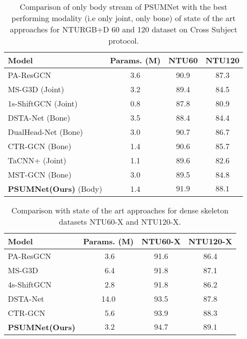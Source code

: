 \documentclass[runningheads]{llncs}
\begin{document}
\begin{table}[!t]
  \resizebox{0.75\linewidth}{!} 
    {\begin{tabular}{l|c|cc}
    \toprule
    Model & Params. (M) &  NTU60 & NTU120\\
    \midrule
PA-ResGCN\cite{song2020stronger} & 3.6 & 90.9 & 87.3 \\
    MS-G3D (Joint)\cite{liu2020disentangling} & 3.2 & 89.4 & 84.5 \\
    1s-ShiftGCN (Joint)\cite{cheng2020shiftgcn} & 0.8 & 87.8 & 80.9\\
    DSTA-Net (Bone)\cite{dstanet_accv2020} & 3.5 & 88.4 & 84.4\\
    DualHead-Net (Bone)\cite{chen2021learning} & 3.0 & 90.7 & 86.7 \\
    CTR-GCN (Bone)\cite{chen2021channel} & 1.4 & 90.6 & 85.7\\
    TaCNN+ (Joint)\cite{xu2021topology} & 1.1 & 89.6 & 82.6\\
    MST-GCN (Bone)\cite{chen2021multi} & 3.0 & 89.5 & 84.8\\
    \midrule
    \textbf{PSUMNet(Ours)} (Body) & 1.4 & $\mathbf{91.9}$ & $\mathbf{88.1}$\\
    
  \bottomrule
  
\end{tabular}
}
\caption{\label{tab:results_single_stream}Comparison of only body stream of PSUMNet with the best performing modality (i.e only joint, only bone) of state of the art approaches for NTURGB+D 60 and 120 dataset on Cross Subject protocol.}
\end{table}

\begin{table}[!t]
  \resizebox{0.75\linewidth}{!} 
    {\begin{tabular}{l|c|cc}
    \toprule
    Model & Params. (M) &  NTU60-X & NTU120-X\\
    \midrule
PA-ResGCN\cite{song2020stronger} & $\,\,$3.6 & 91.6 & 86.4 \\
    MS-G3D\cite{liu2020disentangling} & $\,\,$6.4 & 91.8 & 87.1 \\
    4s-ShiftGCN\cite{cheng2020shiftgcn} & $\,\,$2.8 & 91.8 & 86.2\\
    DSTA-Net\cite{dstanet_accv2020} & 14.0 & 93.5 & 87.8\\
    CTR-GCN \cite{chen2021channel} & $\,\,$5.6 & 93.9 & 88.3\\
    \midrule
    \textbf{PSUMNet(Ours)} & $\,\,3.2$ & $\mathbf{94.7}$ & $\mathbf{89.1}$\\
  \bottomrule
\end{tabular}
}
\caption{\label{tab:ntux_results}Comparison with state of the art approaches for dense skeleton datasets NTU60-X and NTU120-X.}
\end{table}
\end{document}
